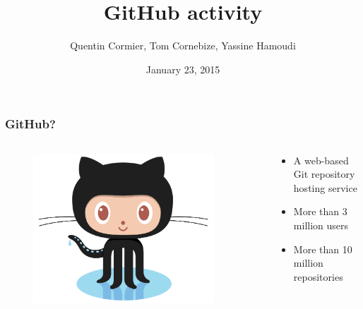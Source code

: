 \documentclass[12pt,t]{beamer}
\title{GitHub activity}
\subtitle{}
\date{January 23, 2015}
\institute{École Normale Supérieure de Lyon}
\author{Quentin Cormier, Tom Cornebize, Yassine Hamoudi}
\begin{document}
\maketitle

\begin{frame}
    \frametitle{GitHub?}
    \begin{columns}
    \begin{column}{0.4\textwidth}
        \vspace{1cm}
        \begin{figure}
        \includegraphics[width=0.9\textwidth]{Octocat.png}
        \end{figure}
    \end{column}
    \begin{column}{0.6\textwidth}
        \vspace{2cm}
        \begin{itemize}
            \item A web-based Git repository hosting service
            \item More than 3 million users
            \item More than 10 million repositories
        \end{itemize}
    \end{column}
    \end{columns}
\end{frame}
\end{document}
